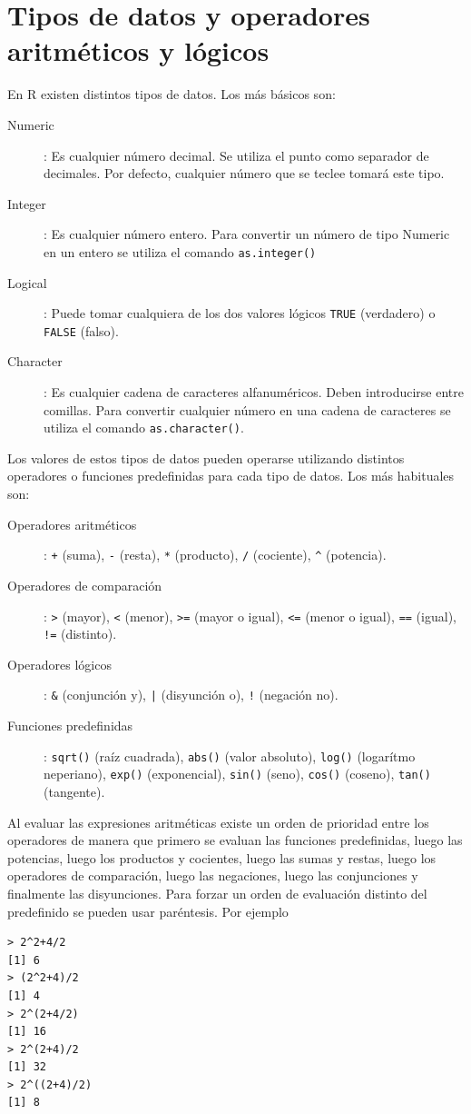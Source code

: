 \section{Tipos de datos y operadores aritméticos y lógicos}
En R existen distintos tipos de datos. Los más básicos son:
\begin{description}
\item[Numeric]: Es cualquier número decimal. Se utiliza el punto como separador de decimales. Por defecto, cualquier
número que se teclee tomará este tipo.
\item[Integer]: Es cualquier número entero. Para convertir un número de tipo Numeric en un entero se utiliza el comando
\lstinline{as.integer()}
\item[Logical]: Puede tomar cualquiera de los dos valores lógicos \lstinline{TRUE} (verdadero) o \lstinline{FALSE}
(falso).
\item[Character]: Es cualquier cadena de caracteres alfanuméricos. Deben introducirse entre comillas. Para convertir
cualquier número en una cadena de caracteres se utiliza el comando \lstinline{as.character()}.
\end{description}

Los valores de estos tipos de datos pueden operarse utilizando distintos operadores o funciones predefinidas para cada
tipo de datos. Los más habituales son:
\begin{description}
\item[Operadores aritméticos]: \lstinline{+} (suma), \lstinline{-} (resta), \lstinline{*} (producto), \lstinline{/}
(cociente), \lstinline{^} (potencia).
\item[Operadores de comparación]: \lstinline{>} (mayor), \lstinline{<} (menor), \lstinline{>=} (mayor o igual),
\lstinline{<=} (menor o igual), \lstinline{==} (igual), \lstinline{!=} (distinto).
\item[Operadores lógicos]:  \lstinline{&} (conjunción y), \lstinline{|} (disyunción o), \lstinline{!} (negación no).
\item[Funciones predefinidas]: \lstinline{sqrt()} (raíz cuadrada), \lstinline{abs()} (valor absoluto),
\lstinline{log()} (logarítmo neperiano), \lstinline{exp()} (exponencial), \lstinline{sin()} (seno), \lstinline{cos()}
(coseno), \lstinline{tan()} (tangente).
\end{description}

Al evaluar las expresiones aritméticas existe un orden de prioridad entre los operadores de manera que primero se
evaluan las funciones predefinidas, luego las potencias, luego los productos y cocientes, luego las sumas y restas,
luego los operadores de comparación, luego las negaciones, luego las conjunciones y finalmente las disyunciones. Para
forzar un orden de evaluación distinto del predefinido se pueden usar paréntesis. Por ejemplo
\begin{lstlisting}
> 2^2+4/2
[1] 6
> (2^2+4)/2
[1] 4
> 2^(2+4/2)
[1] 16
> 2^(2+4)/2
[1] 32
> 2^((2+4)/2)
[1] 8
\end{lstlisting}

